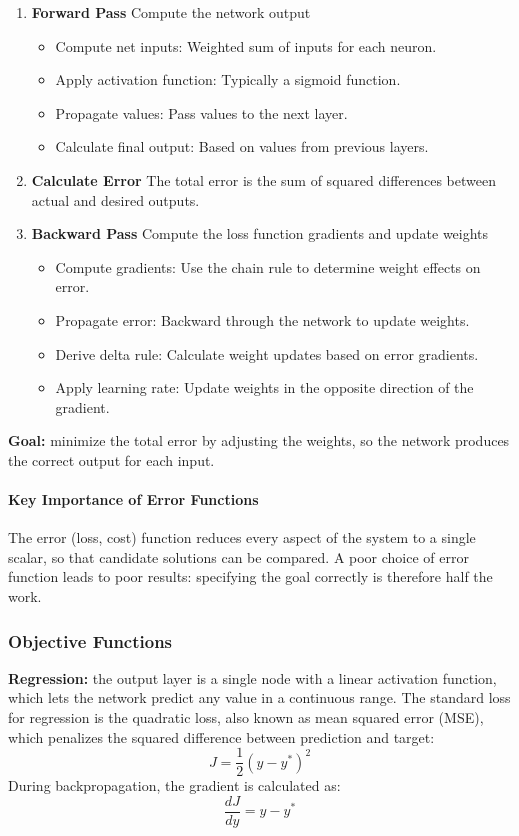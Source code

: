 \begin{enumerate}
    \item \textbf{Forward Pass} Compute the network output
    \begin{itemize}
        \item Compute net inputs: Weighted sum of inputs for each neuron.
        \item Apply activation function: Typically a sigmoid function.
        \item Propagate values: Pass values to the next layer.
        \item Calculate final output: Based on values from previous layers.
    \end{itemize}

    \item \textbf{Calculate Error} The total error is the sum of squared differences between actual and desired outputs.

    \item \textbf{Backward Pass}  Compute the loss function gradients and update weights
    \begin{itemize}
        \item Compute gradients: Use the chain rule to determine weight effects on error.
        \item Propagate error: Backward through the network to update weights.
        \item Derive delta rule: Calculate weight updates based on error gradients.
        \item Apply learning rate: Update weights in the opposite direction of the gradient.
    \end{itemize}
\end{enumerate}

\textbf{Goal:} minimize the total error by adjusting the weights, so the network produces the correct output for each input.

\paragraph{Key Importance of Error Functions}
The error (loss, cost) function reduces every aspect of the system to a single scalar, so that candidate solutions can be compared. A poor choice of error function leads to poor results: specifying the goal correctly is therefore half the work.

\subsubsection{Objective Functions}
\textbf{Regression:} the output layer is a single node with a linear activation function, which lets the network predict any value in a continuous range. The standard loss for regression is the quadratic loss, also known as mean squared error (MSE), which penalizes the squared difference between prediction and target:
\begin{equation}
    J = \frac{1}{2}(y - y^*)^2
\end{equation}
During backpropagation, the gradient is calculated as:
\begin{equation}
\frac{dJ}{dy} = y - y^*    
\end{equation}

